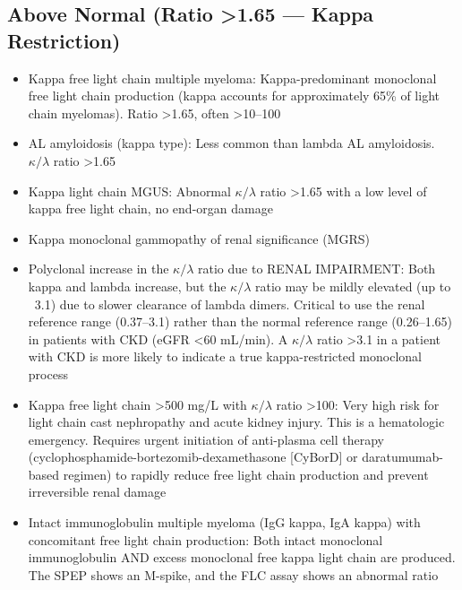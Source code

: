 \subsection*{Above Normal (Ratio >1.65 --- Kappa Restriction)}
\begin{itemize}
  \item Kappa free light chain multiple myeloma: Kappa-predominant monoclonal free light chain production (kappa accounts for approximately 65\% of light chain myelomas). Ratio >1.65, often >10--100
  \item AL amyloidosis (kappa type): Less common than lambda AL amyloidosis. $\kappa/\lambda$ ratio >1.65
  \item Kappa light chain MGUS: Abnormal $\kappa/\lambda$ ratio >1.65 with a low level of kappa free light chain, no end-organ damage
  \item Kappa monoclonal gammopathy of renal significance (MGRS)
  \item Polyclonal increase in the $\kappa/\lambda$ ratio due to RENAL IMPAIRMENT: Both kappa and lambda increase, but the $\kappa/\lambda$ ratio may be mildly elevated (up to ~3.1) due to slower clearance of lambda dimers. Critical to use the renal reference range (0.37--3.1) rather than the normal reference range (0.26--1.65) in patients with CKD (eGFR <60 mL/min). A $\kappa/\lambda$ ratio >3.1 in a patient with CKD is more likely to indicate a true kappa-restricted monoclonal process
  \item Kappa free light chain >500 mg/L with $\kappa/\lambda$ ratio >100: Very high risk for light chain cast nephropathy and acute kidney injury. This is a hematologic emergency. Requires urgent initiation of anti-plasma cell therapy (cyclophosphamide-bortezomib-dexamethasone [CyBorD] or daratumumab-based regimen) to rapidly reduce free light chain production and prevent irreversible renal damage
  \item Intact immunoglobulin multiple myeloma (IgG kappa, IgA kappa) with concomitant free light chain production: Both intact monoclonal immunoglobulin AND excess monoclonal free kappa light chain are produced. The SPEP shows an M-spike, and the FLC assay shows an abnormal ratio
\end{itemize}

